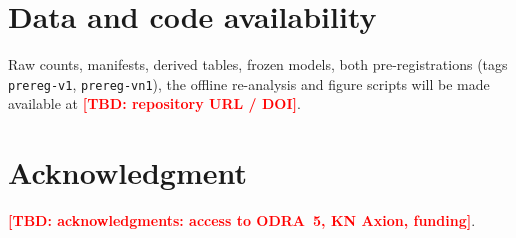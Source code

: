 \documentclass[conference]{IEEEtran}
\newcommand{\TBD}[1]{\textcolor{red}{\textbf{[TBD: #1]}}}
\begin{document}
\section*{Data and code availability}
Raw counts, manifests, derived tables, frozen models, both pre-registrations (tags
\texttt{prereg-v1}, \texttt{prereg-vn1}), the offline re-analysis and figure scripts will be
made available at \TBD{repository URL / DOI}.

\section*{Acknowledgment}
\TBD{acknowledgments: access to ODRA~5, KN Axion, funding}.



\end{document}
